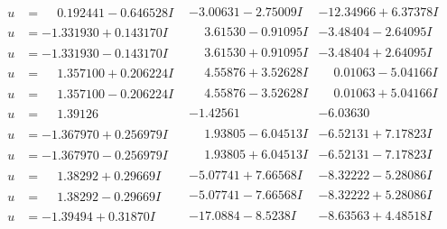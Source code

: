 \documentclass[1p]{elsarticle_modified}
\theoremstyle{definition}
\begin{document}
$$\begin{array}{c|c|c}
\begin{aligned}
u &= \phantom{-}0.192441 - 0.646528 I\end{aligned}
 & -3.00631 - 2.75009 I & -12.34966 + 6.37378 I \\ \hline\begin{aligned}
u &= -1.331930 + 0.143170 I\end{aligned}
 & \phantom{-}3.61530 - 0.91095 I & -3.48404 - 2.64095 I \\ \hline\begin{aligned}
u &= -1.331930 - 0.143170 I\end{aligned}
 & \phantom{-}3.61530 + 0.91095 I & -3.48404 + 2.64095 I \\ \hline\begin{aligned}
u &= \phantom{-}1.357100 + 0.206224 I\end{aligned}
 & \phantom{-}4.55876 + 3.52628 I & \phantom{-}0.01063 - 5.04166 I \\ \hline\begin{aligned}
u &= \phantom{-}1.357100 - 0.206224 I\end{aligned}
 & \phantom{-}4.55876 - 3.52628 I & \phantom{-}0.01063 + 5.04166 I \\ \hline\begin{aligned}
u &= \phantom{-}1.39126\phantom{ +0.000000I}\end{aligned}
 & -1.42561\phantom{ +0.000000I} & -6.03630\phantom{ +0.000000I} \\ \hline\begin{aligned}
u &= -1.367970 + 0.256979 I\end{aligned}
 & \phantom{-}1.93805 - 6.04513 I & -6.52131 + 7.17823 I \\ \hline\begin{aligned}
u &= -1.367970 - 0.256979 I\end{aligned}
 & \phantom{-}1.93805 + 6.04513 I & -6.52131 - 7.17823 I \\ \hline\begin{aligned}
u &= \phantom{-}1.38292 + 0.29669 I\end{aligned}
 & -5.07741 + 7.66568 I & -8.32222 - 5.28086 I \\ \hline\begin{aligned}
u &= \phantom{-}1.38292 - 0.29669 I\end{aligned}
 & -5.07741 - 7.66568 I & -8.32222 + 5.28086 I \\ \hline\begin{aligned}
u &= -1.39494 + 0.31870 I\end{aligned}
 & -17.0884 - 8.5238 I & -8.63563 + 4.48518 I \\ \hline\begin{aligned}

\end{aligned}
\end{array}$$
\end{document}
